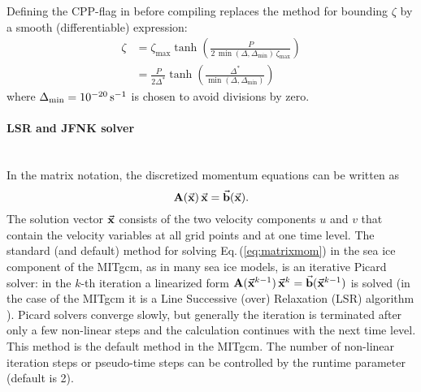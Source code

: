 Defining the CPP-flag  in
 before compiling replaces the method for
bounding $\zeta$ by a smooth (differentiable) expression:
\begin{equation}
  \label{eq:zetaregsmooth}
  \begin{split}
  \zeta &= \zeta_{\max}\tanh\left(\frac{P}{2\,\min(\Delta,\Delta_{\min})
      \,\zeta_{\max}}\right)\\
  &= \frac{P}{2\Delta^*}
  \tanh\left(\frac{\Delta^*}{\min(\Delta,\Delta_{\min})}\right) 
  \end{split}
\end{equation}
where $\Delta_{\min}=10^{-20}\text{\,s}^{-1}$ is chosen to avoid divisions
by zero.

\paragraph{LSR and  JFNK solver \label{sec:pkg:seaice:LSRJFNK}}~\\
%

\newcommand{\mat}[1]{\ensuremath{\mathbf{#1}}} 
%
In the matrix notation, the discretized momentum equations can be
written as
\begin{equation}
  \label{eq:matrixmom}
  \mat{A}(\vek{x})\,\vek{x} = \vek{b}(\vek{x}).
\end{equation}
The solution vector $\vec{\mathbf{x}}$ consists of the two velocity components
$u$ and $v$ that contain the velocity variables at all grid points and
at one time level. The standard (and default) method for solving
Eq.\,(\ref{eq:matrixmom}) in the sea ice component of the
\mbox{MITgcm}, as in many sea ice models, is an iterative Picard
solver: in the $k$-th iteration a linearized form
$\mat{A}(\vek{x}^{k-1})\,\vek{x}^{k} = \vek{b}(\vek{x}^{k-1})$ is
solved (in the case of the MITgcm it is a Line Successive (over)
Relaxation (LSR) algorithm \citep{zhang97}).  Picard solvers converge
slowly, but generally the iteration is terminated after only a few
non-linear steps \citep{zhang97, lemieux09} and the calculation
continues with the next time level. This method is the default method
in the MITgcm. The number of non-linear iteration steps or pseudo-time
steps can be controlled by the runtime parameter
 (default is 2).

